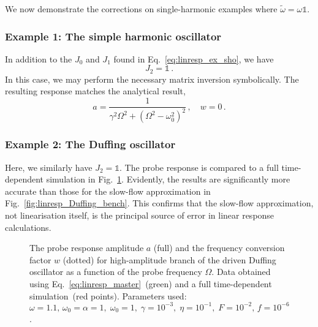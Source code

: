 We now demonstrate the corrections on single-harmonic examples where $\tilde{\omega} = \omega \mathbb{1}$.

\subsubsection{Example 1: The simple harmonic oscillator}

In addition to the $J_0$ and $J_1$ found in Eq.~\eqref{eq:linresp_ex_sho}, we have
\begin{equation}
J_2 = \mathbb{1} \,.%
\end{equation}
In this case, we may perform the necessary matrix inversion symbolically. The resulting response matches the analytical result,
\begin{equation}
a = \frac{1}{ \gamma^2 \Omega^2 + \left(\Omega^2 - \omega_0^2 \right)^2} \,, \quad w= 0  \,.
\end{equation}

\subsubsection{Example 2: The Duffing oscillator}

Here, we similarly have $J_2 =\mathbb{1}$. The probe response is compared to a full time-dependent simulation in Fig.~\ref{fig:respcorr_duff}. Evidently, the results are significantly more accurate than those for the slow-flow approximation in Fig.~\ref{fig:linresp_Duffing_bench}. This confirms that the slow-flow approximation, not linearisation itself, is the principal source of error in linear response calculations. 
\begin{figure} [h!]
	\centering
	
	\caption{The probe response amplitude $a$ (full) and the frequency conversion factor $w$ (dotted) for high-amplitude branch of the driven Duffing oscillator as a function of the probe frequency $\Omega$. Data obtained using Eq.~\eqref{eq:linresp_master}~(green) and a full time-dependent simulation~(red points). Parameters used: $\omega=1.1,\,\omega_0 = \alpha = 1, \; \omega_0 = 1, \; \gamma = 10^{-3} , \; \eta = 10^{-1},\; F = 10^{-2},\,f = 10^{-6}$.}

	\label{fig:respcorr_duff}
\end{figure}

